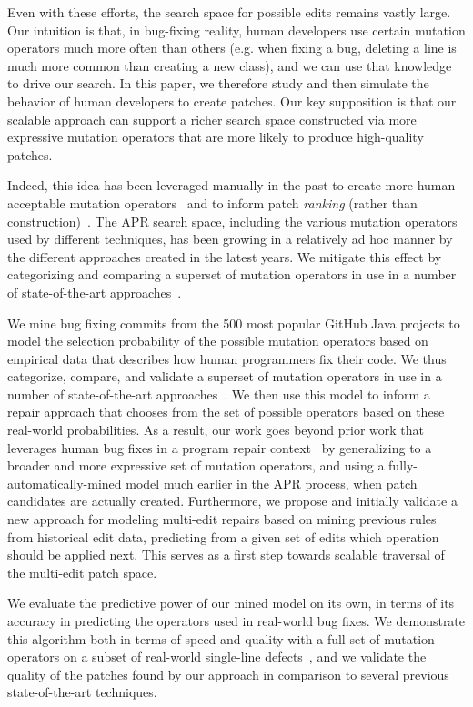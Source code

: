 \documentclass[conference]{IEEEtran}
\begin{document}
Even with these efforts, the search space for possible edits remains vastly large. Our intuition is that, in bug-fixing reality, human developers use certain mutation operators 
much more often than 
others (e.g. when fixing a bug, deleting a line is much more common than creating a new class), and we can use that knowledge to drive our search. In this paper, we therefore study and then simulate the behavior of human
developers to create patches. Our key supposition is that our scalable approach can support a richer
search space constructed via more expressive mutation operators that are more
likely to produce high-quality patches.

Indeed, this idea has been
leveraged manually in the past to create more human-acceptable mutation
operators~\cite{kim2013} and to inform patch \emph{ranking} (rather than construction)~\cite{xuan16,long16proph}.
The APR search space, including the various mutation
operators used by different techniques, has been growing in a relatively ad hoc 
manner by the different approaches created in the latest years. We mitigate this effect by categorizing and comparing a superset of
mutation operators in use in a number of 
state-of-the-art approaches~\cite{legoues12,Weimer13,kim2013,long16proph}.

We mine bug fixing commits from 
the 500 most popular GitHub Java projects to model the selection probability of
the possible mutation operators based on 
empirical data that describes how human programmers fix their code.  We thus
categorize, compare, and validate a superset of
mutation operators in use in a number of 
state-of-the-art approaches~\cite{legoues12,Weimer13,kim2013,long16proph}. We then use this
model to inform a repair approach that chooses from the set of possible
operators based on these real-world
probabilities.
As a result, our work goes beyond prior work that leverages human bug
fixes in a program repair context~\cite{kim2013,xuan16,long16proph} by generalizing
to a broader and more expressive set of
mutation operators, and using a fully-automatically-mined model much 
earlier in the APR process, when
patch candidates are actually created.  
Furthermore, we propose and initially validate a new approach for modeling
multi-edit repairs based on mining previous rules from historical edit data, 
predicting from a given 
set of edits which operation should be applied
next.  This serves  as a first step towards
scalable traversal of the multi-edit patch space. 


We evaluate the predictive power of our mined model on its own, in terms of its
accuracy in predicting the operators used in real-world bug fixes. We demonstrate this algorithm both in terms of speed and quality with a full set of mutation
operators on a subset of real-world single-line defects~\cite{just14}, and we validate the quality of the patches found by our approach
in comparison to several previous state-of-the-art techniques. 
\end{document}
